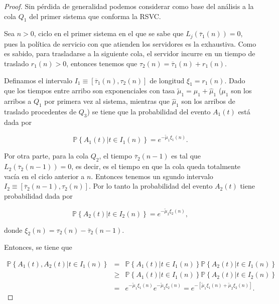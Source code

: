 \documentclass{article}
\newcommand{\prob}{\mathbb{P}}
\numberwithin{equation}{section}
\begin{document}
\begin{proof}
Sin p\'erdida de generalidad podemos considerar como base del an\'alisis a la cola $Q_{1}$ del primer sistema que conforma la RSVC.

Sea $n>0$, ciclo en el primer sistema en el que se sabe que $L_{j}\left(\overline{\tau}_{1}\left(n\right)\right)=0$, pues la pol\'itica de servicio con que atienden los servidores es la exhaustiva. Como es sabido, para trasladarse a la siguiente cola, el servidor incurre en un tiempo de traslado $r_{1}\left(n\right)>0$, entonces tenemos que $\tau_{2}\left(n\right)=\overline{\tau}_{1}\left(n\right)+r_{1}\left(n\right)$.


Definamos el intervalo $I_{1}\equiv\left[\overline{\tau}_{1}\left(n\right),\tau_{2}\left(n\right)\right]$ de longitud $\xi_{1}=r_{1}\left(n\right)$. Dado que los tiempos entre arribo son exponenciales con tasa $\tilde{\mu}_{1}=\mu_{1}+\hat{\mu}_{1}$ ($\mu_{1}$ son los arribos a $Q_{1}$ por primera vez al sistema, mientras que $\hat{\mu}_{1}$ son los arribos de traslado procedentes de $Q_{3}$) se tiene que la probabilidad del evento $A_{1}\left(t\right)$ est\'a dada por 

\begin{equation}
\prob\left\{A_{1}\left(t\right)|t\in I_{1}\left(n\right)\right\}=e^{-\tilde{\mu}_{1}\xi_{1}\left(n\right)}.
\end{equation} 

Por otra parte, para la cola $Q_{2}$, el tiempo $\overline{\tau}_{2}\left(n-1\right)$ es tal que $L_{2}\left(\overline{\tau}_{2}\left(n-1\right)\right)=0$, es decir, es el tiempo en que la cola queda totalmente vac\'ia en el ciclo anterior a $n$. Entonces tenemos un sgundo intervalo $I_{2}\equiv\left[\overline{\tau}_{2}\left(n-1\right),\tau_{2}\left(n\right)\right]$. Por lo tanto la probabilidad del evento $A_{2}\left(t\right)$ tiene probabilidad dada por

\begin{equation}
\prob\left\{A_{2}\left(t\right)|t\in I_{2}\left(n\right)\right\}=e^{-\tilde{\mu}_{2}\xi_{2}\left(n\right)},
\end{equation} 

donde $\xi_{2}\left(n\right)=\tau_{2}\left(n\right)-\overline{\tau}_{2}\left(n-1\right)$.



Entonces, se tiene que

\begin{eqnarray*}
\prob\left\{A_{1}\left(t\right),A_{2}\left(t\right)|t\in I_{1}\left(n\right)\right\}&=&
\prob\left\{A_{1}\left(t\right)|t\in I_{1}\left(n\right)\right\}
\prob\left\{A_{2}\left(t\right)|t\in I_{1}\left(n\right)\right\}\\
&\geq&
\prob\left\{A_{1}\left(t\right)|t\in I_{1}\left(n\right)\right\}
\prob\left\{A_{2}\left(t\right)|t\in I_{2}\left(n\right)\right\}\\
&=&e^{-\tilde{\mu}_{1}\xi_{1}\left(n\right)}e^{-\tilde{\mu}_{2}\xi_{2}\left(n\right)}
=e^{-\left[\tilde{\mu}_{1}\xi_{1}\left(n\right)+\tilde{\mu}_{2}\xi_{2}\left(n\right)\right]}.
\end{eqnarray*}



\end{proof}
\end{document}
